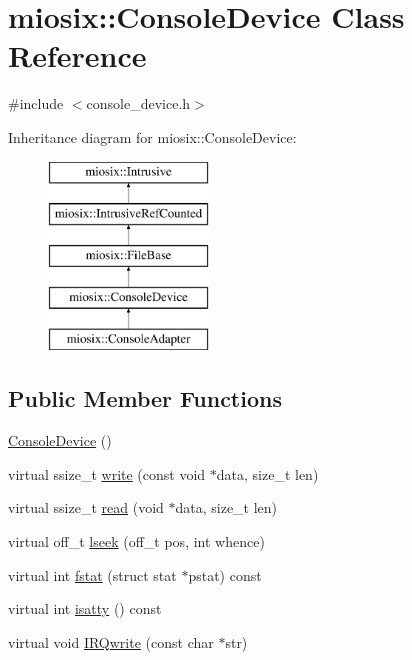 \hypertarget{classmiosix_1_1_console_device}{\section{miosix\-:\-:Console\-Device Class Reference}
\label{classmiosix_1_1_console_device}
}


{\ttfamily \#include $<$console\-\_\-device.\-h$>$}

Inheritance diagram for miosix\-:\-:Console\-Device\-:\begin{figure}[H]
\begin{center}
\leavevmode
\includegraphics[height=5.000000cm]{classmiosix_1_1_console_device}
\end{center}
\end{figure}
\subsection*{Public Member Functions}
\begin{DoxyCompactItemize}
\item 
\hyperlink{classmiosix_1_1_console_device_a34a8833bb9692f3f5a0111afcbf288d9}{Console\-Device} ()
\item 
virtual ssize\-\_\-t \hyperlink{classmiosix_1_1_console_device_a8d54dd289d7856569fffb26fa12da419}{write} (const void $\ast$data, size\-\_\-t len)
\item 
virtual ssize\-\_\-t \hyperlink{classmiosix_1_1_console_device_a289bc47b6fc9ddbb21b5f51b001a1dcc}{read} (void $\ast$data, size\-\_\-t len)
\item 
virtual off\-\_\-t \hyperlink{classmiosix_1_1_console_device_a0f121b9403c753b6ee1a660e8d982961}{lseek} (off\-\_\-t pos, int whence)
\item 
virtual int \hyperlink{classmiosix_1_1_console_device_add4a0374850b83a89d990b1dcd491063}{fstat} (struct stat $\ast$pstat) const 
\item 
virtual int \hyperlink{classmiosix_1_1_console_device_a7f588f7daa3fdbd1f2129f1ba0c388ae}{isatty} () const 
\item 
virtual void \hyperlink{classmiosix_1_1_console_device_a63debd964ea5419e2606323b1d6e5478}{I\-R\-Qwrite} (const char $\ast$str)
\end{DoxyCompactItemize}
